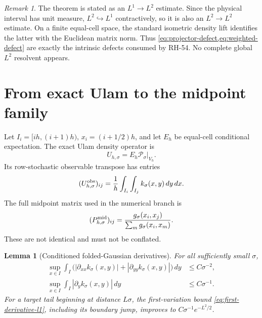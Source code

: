 \documentclass[11pt]{article}
\newtheorem{lemma}[theorem]{Lemma}
\theoremstyle{remark}
\newtheorem{remark}[theorem]{Remark}
\newcommand{\cP}{\mathcal P}
\begin{document}
\begin{remark}
The theorem is stated as an $L^1\to L^2$ estimate.  Since the physical
interval has unit measure, $L^2\hookrightarrow L^1$ contractively, so it is
also an $L^2\to L^2$ estimate.  On a finite equal-cell space, the standard
isometric density lift identifies the latter with the Euclidean matrix
norm.  Thus \cref{eq:projector-defect,eq:weighted-defect} are exactly the
intrinsic defects consumed by RH-54.  No complete global $L^2$ resolvent
appears.
\end{remark}

\section{From exact Ulam to the midpoint family}

Let $I_i=[ih,(i+1)h)$, $x_i=(i+1/2)h$, and let $E_h$ be equal-cell
conditional expectation.  The exact Ulam density operator is
\[
 U_{h,\sigma}=E_h\cP_\sigma|_{V_h}.
\]
Its row-stochastic observable transpose has entries
\begin{equation}
 (U^{\rm obs}_{h,\sigma})_{ij}
 =\frac1h\int_{I_i}\int_{I_j}k_\sigma(x,y)\,dy\,dx.
 \label{eq:exact-ulam}
\end{equation}
The full midpoint matrix used in the numerical branch is
\begin{equation}
 (P^{\rm mid}_{h,\sigma})_{ij}
 =\frac{g_\sigma(x_i,x_j)}{\sum_mg_\sigma(x_i,x_m)}.
 \label{eq:midpoint-matrix}
\end{equation}
These are not identical and must not be conflated.

\begin{lemma}[Conditioned folded-Gaussian derivatives]
\label{lem:kernel-derivatives}
For all sufficiently small $\sigma$,
\begin{align}
 \sup_{x\in I}\int_I
 \bigl(|\partial_{xx}k_\sigma(x,y)|
      +|\partial_{yy}k_\sigma(x,y)|\bigr)\,dy
 &\le C\sigma^{-2},
 \label{eq:second-derivative-l1}\\
 \sup_{x\in I}\int_I|\partial_y k_\sigma(x,y)|\,dy
 &\le C\sigma^{-1}.
 \label{eq:first-derivative-l1}
\end{align}
For a target tail beginning at distance $L\sigma$, the first-variation
bound \eqref{eq:first-derivative-l1}, including its boundary jump, improves
to $C\sigma^{-1}e^{-L^2/2}$.
\end{lemma}
\end{document}
